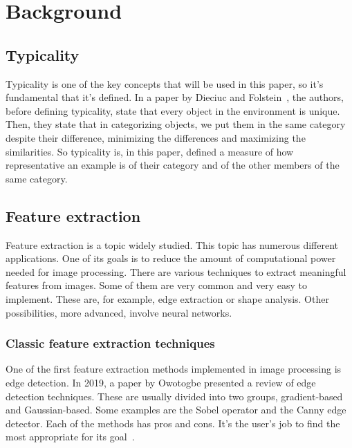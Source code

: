 \documentclass[conference]{IEEEtran}
\begin{document}
	\section{Background}
	
		\subsection{Typicality}
		
			\noindent Typicality is one of the key concepts that will be used in this paper, so it's fundamental that it's defined. In a paper by Dieciuc and Folstein~\cite{dieciuc2019typicality},
			the authors, before defining typicality, state that every object in the environment is unique. Then, they state that in categorizing objects, we put them in the same category 
			despite their difference, minimizing the differences and maximizing the similarities. So typicality is, in this paper, defined  a measure of how representative an example is of their category and 
			of the other members of the same category. 
			

		\subsection{Feature extraction}

			\noindent Feature extraction is a topic widely studied. 
			This topic has numerous different applications. 
			One of its goals is to reduce the amount of computational power needed for image processing. 
			There are various techniques to extract meaningful features from images. 
			Some of them are very common and very easy to implement. 
			These are, for example, edge extraction or shape analysis. 
			Other possibilities, more advanced, involve neural networks.\\

				\subsubsection{Classic feature extraction techniques}
					
					One of the first feature extraction methods implemented in image processing is edge detection.				
					In 2019, a paper by Owotogbe presented a review of edge detection techniques. 
					These are usually divided into two groups, gradient-based and Gaussian-based. 
					Some examples are the Sobel operator and the Canny edge detector. 
					Each of the methods has pros and cons. 
					It's the user's job to find the most appropriate for its goal~\cite{owotogbe2019edge}.\\
					
\end{document}
